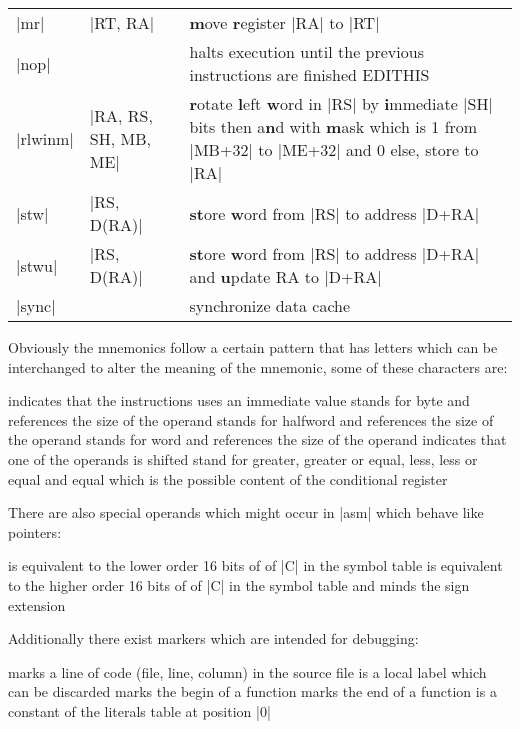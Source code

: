 \begin{tabular}{l l p{9cm}}
    |mr| & |RT, RA| & \textbf{m}ove \textbf{r}egister |RA| to |RT| \\
    |nop| & & halts execution until the previous instructions are finished EDITHIS\\
    |rlwinm| & |RA, RS, SH, MB, ME| & \textbf{r}otate \textbf{l}eft \textbf{w}ord in |RS| by \textbf{i}mmediate |SH| bits then a\textbf{n}d with \textbf{m}ask which is 1 from |MB+32| to |ME+32| and 0 else, store to |RA|\\
    |stw| & |RS, D(RA)| & \textbf{st}ore \textbf{w}ord from |RS| to address |D+RA|\\
    |stwu| & |RS, D(RA)| & \textbf{st}ore \textbf{w}ord from |RS| to address |D+RA| and \textbf{u}pdate RA to |D+RA|\\
    |sync| & & synchronize data cache\\
\end{tabular}

Obviously the mnemonics follow a certain pattern that has letters which can be interchanged to alter the meaning of the mnemonic, some of these characters are:
\begin{description}
     indicates that the instructions uses an immediate value
     stands for byte and references the size of the operand
     stands for halfword and references the size of the operand
     stands for word and references the size of the operand
     indicates that one of the operands is shifted
     stand for greater, greater or equal, less, less or equal and equal which is the possible content of the conditional register
\end{description}

There are also special operands which might occur in |asm| which behave like pointers:
\begin{description}
     is equivalent to the lower order 16 bits of of |C| in the symbol table
     is equivalent to the higher order 16 bits of of |C| in the symbol table and minds the sign extension
\end{description}

Additionally there exist markers which are intended for debugging:
\begin{description}
         marks a line of code (file, line, column) in the source file
         is a local label which can be discarded
         marks the begin of a function
         marks the end of a function
         is a constant of the literals table at position |0|
\end{description}

\newpage
\listoftodos[Notes]

